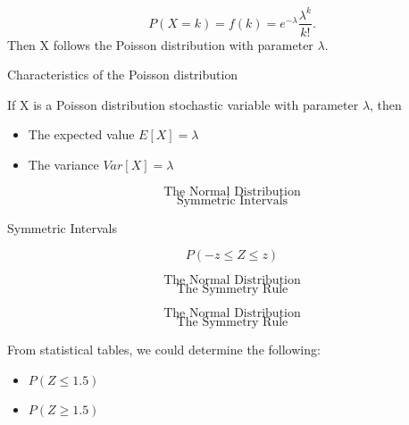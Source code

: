 \documentclass[12pt]{report}
\begin{document}
\[ P(X=k)=f(k)= e^{-\lambda} \frac{\lambda ^k}{k!}.\] 
Then X follows the Poisson distribution with parameter $\lambda$.

Characteristics of the Poisson distribution

If X is a Poisson distribution stochastic variable with parameter $\lambda$, then

\begin{itemize}
	\item The expected value $E[X]=\lambda$
	\item The variance $Var[X]=\lambda$
\end{itemize}





\huge
\[ \mbox{The Normal Distribution} \]
\Large
\[ \mbox{Symmetric Intervals} \]







Symmetric Intervals

\[ P( -z \leq Z \leq z) \]










\huge
\[ \mbox{The Normal Distribution} \]
\Large
\[ \mbox{The Symmetry Rule} \]







\huge
\[ \mbox{The Normal Distribution} \]
\Large
\[ \mbox{The Symmetry Rule} \]



\Large
From statistical tables, we could determine the following:
\begin{itemize}
	\item $P(Z \leq 1.5) $
	\item $P(Z \geq 1.5) $
\end{itemize}


\end{document}

